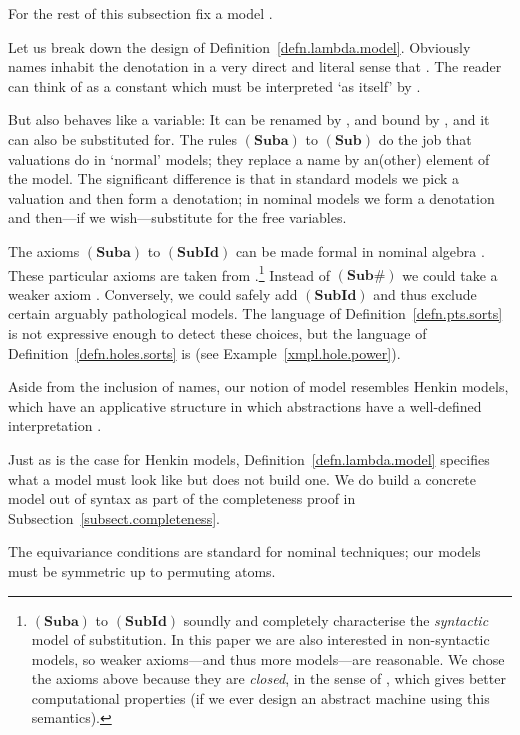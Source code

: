 \documentclass[submission,copyright]{eptcs}
\newcommand{\rulefont}[1]{\ensuremath{(\mathbf{#1})}}
\begin{document}
For the rest of this subsection fix a model . 

Let us break down the design of Definition~\ref{defn.lambda.model}.
Obviously names inhabit the denotation in a very direct and literal sense that .
The reader can think of  as a constant which must be interpreted `as itself' by .

But  also behaves like a variable:
It can be renamed by , and bound by , and it can also be substituted for.
The rules \rulefont{Suba} to \rulefont{Sub\text{}} do the job that valuations do in `normal' models; they replace a name  by an(other) element of the model.
The significant difference is that in standard models we pick a valuation and then form a denotation; in nominal models we form a denotation and then---if we wish---substitute for the free variables.

The axioms \rulefont{Suba} to \rulefont{SubId} can be made formal in nominal algebra \cite{gabbay:nomuae}.
These particular axioms are taken from \cite{gabbay:capasn-jv}.\footnote{\rulefont{Suba} to \rulefont{SubId} soundly and completely characterise the \emph{syntactic} model of substitution.
In this paper we are also interested in non-syntactic models, so weaker axioms---and thus more models---are reasonable.  
We chose the axioms above because they are \emph{closed}, in the sense of \cite{gabbay:nomr-jv,gabbay:clonre}, which gives better computational properties (if we ever design an abstract machine using this semantics).
}
Instead of \rulefont{Sub\#} we could take a weaker axiom .
Conversely, we could safely add \rulefont{SubId} and thus exclude certain arguably pathological models.
The language of Definition~\ref{defn.pts.sorts} is not expressive enough to detect these choices, but the language of Definition~\ref{defn.holes.sorts} is (see Example~\ref{xmpl.hole.power}).



Aside from the inclusion of names, our notion of model resembles Henkin models, which have an applicative structure in which abstractions have a well-defined interpretation \cite{henkin:comtot}.


Just as is the case for Henkin models, Definition~\ref{defn.lambda.model} specifies what a model must look like but does not build one.
We do build a concrete model out of syntax as part of the completeness proof in Subsection~\ref{subsect.completeness}. 
 

The equivariance conditions are standard for nominal techniques; our models must be symmetric up to permuting atoms.
\end{document}
